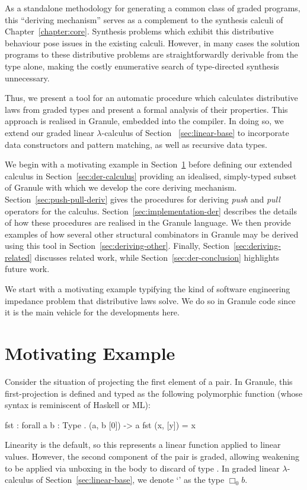 As a standalone methodology for generating a common class of graded programs,
this ``deriving mechanism'' serves as a complement to the synthesis calculi of
Chapter~\ref{chapter:core}. Synthesis problems which exhibit this distributive
behaviour pose issues in the existing calculi. However, in many cases the
solution programs to these distributive problems are straightforwardly derivable
from the type alone, making the costly enumerative search of type-directed synthesis
unnecessary.

Thus, we present a tool for an automatic procedure which calculates distributive
laws from graded types and present a formal analysis of their properties. This
approach is realised in Granule, embedded into the compiler. In doing so, we 
extend our graded linear $\lambda$-calculus of Section
~\ref{sec:linear-base} to incorporate data constructors and pattern matching, as well 
as recursive data types. 

We begin with a motivating example in Section~\ref{sec:motivating-example}
before defining our extended calculus in Section~\ref{sec:der-calculus}
providing an idealised, simply-typed subset of Granule with which we develop the
core deriving mechanism. Section~\ref{sec:push-pull-deriv} gives the procedures
for deriving \emph{push} and \emph{pull} operators for the calculus.
Section~\ref{sec:implementation-der} describes the details of how these
procedures are realised in the Granule language. We then provide examples of how
several other structural combinators in Granule may be derived using this tool
in Section~\ref{sec:deriving-other}. Finally, Section~\ref{sec:deriving-related}
discusses related work, while Section~\ref{sec:der-conclusion} highlights future
work.

We start with a motivating example typifying the kind of software engineering
impedance problem that distributive laws solve. We do so in Granule code since
it is the main vehicle for the developments here.

\section{Motivating Example}
\label{sec:motivating-example}

Consider the situation of projecting the first element of a pair. In Granule,
this first-projection is defined and typed as the following polymorphic function
(whose syntax is reminiscent of Haskell or ML):
%
\begin{granule}
fst : forall { a b : Type } . (a, b [0]) -> a
fst (x, [y]) = x
\end{granule}
%
Linearity is the default, so this represents a linear function applied to linear
values. However, the second component of the pair is graded, allowing weakening
to be applied via unboxing in the body to discard  of type .
In graded linear $\lambda$-calculus of Section~\ref{sec:linear-base}, we denote `' as the
type $\Box_0 b$.

